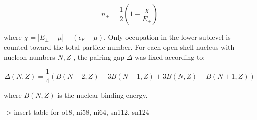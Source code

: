 \begin{equation}
    n_{\pm} = \frac{1}{2}\left( 1-\frac{\chi}{E_{\pm}}\right)
\end{equation}

where $\chi = |E_{\pm}-\mu| - (\epsilon_{F} - \mu)$. Only occupation in the
lower sublevel is counted toward the total particle number. For each open-shell
nucleus with nucleon numbers $N, Z$ , the pairing gap $\Delta$ was fixed according to:

\begin{equation}
    \Delta(N,Z) = \frac{1}{4}\left(B(N-2,Z)-3B(N-1,Z) + 3B(N,Z)-B(N+1,Z)\right)
\end{equation}

where $B(N,Z)$ is the nuclear binding energy.

-> insert table for o18, ni58, ni64, sn112, sn124



\afterpage{\clearpage}

